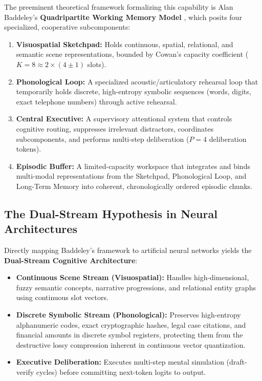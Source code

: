 \documentclass[11pt,a4paper]{article}
\begin{document}
The preeminent theoretical framework formalizing this capability is Alan Baddeley's \textbf{Quadripartite Working Memory Model} \cite{baddeley1974working,baddeley2000episodic}, which posits four specialized, cooperative subcomponents:
\begin{enumerate}
    \item \textbf{Visuospatial Sketchpad:} Holds continuous, spatial, relational, and semantic scene representations, bounded by Cowan's capacity coefficient ($K=8 \approx 2 \times (4 \pm 1)$ slots).
    \item \textbf{Phonological Loop:} A specialized acoustic/articulatory rehearsal loop that temporarily holds discrete, high-entropy symbolic sequences (words, digits, exact telephone numbers) through active rehearsal.
    \item \textbf{Central Executive:} A supervisory attentional system that controls cognitive routing, suppresses irrelevant distractors, coordinates subcomponents, and performs multi-step deliberation ($P=4$ deliberation tokens).
    \item \textbf{Episodic Buffer:} A limited-capacity workspace that integrates and binds multi-modal representations from the Sketchpad, Phonological Loop, and Long-Term Memory into coherent, chronologically ordered episodic chunks.
\end{enumerate}

\subsection{The Dual-Stream Hypothesis in Neural Architectures}
Directly mapping Baddeley's framework to artificial neural networks yields the \textbf{Dual-Stream Cognitive Architecture}:
\begin{itemize}
    \item \textbf{Continuous Scene Stream (Visuospatial):} Handles high-dimensional, fuzzy semantic concepts, narrative progressions, and relational entity graphs using continuous slot vectors.
    \item \textbf{Discrete Symbolic Stream (Phonological):} Preserves high-entropy alphanumeric codes, exact cryptographic hashes, legal case citations, and financial amounts in discrete symbol registers, protecting them from the destructive lossy compression inherent in continuous vector quantization.
    \item \textbf{Executive Deliberation:} Executes multi-step mental simulation (draft-verify cycles) before committing next-token logits to output.
\end{itemize}
\end{document}
